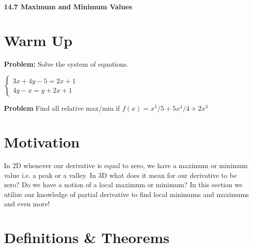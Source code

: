\documentclass[11pt]{article}
\newcommand{\vs}{\vspace*{.1in}}
\begin{document}
\begin{LARGE}\begin{center}\bf 14.7 Maximum and Minimum Values\end{center}
\end{LARGE}

\vs\vs



\section{Warm Up}
\textbf{Problem:} Solve the system of equations.

$\begin{cases}
    3x+4y-5 = 2x+1\\
    4y-x = y+2x+1
\end{cases}$

\vs

\textbf{Problem} Find all relative max/min if $f(x)=x^5/5 +5x^4/4+2x^3$


\section{Motivation}
In 2D whenever our derivative is equal to zero, we have a maximum or minimum value i.e. a peak or a valley. In 3D what does it mean for our derivative to be zero? Do we have a notion of a local maximum or minimum? In this section we utilize our knowledge of partial derivative to find local minimums and maximums and even more!


\section{Definitions \& Theorems}
\end{document}
